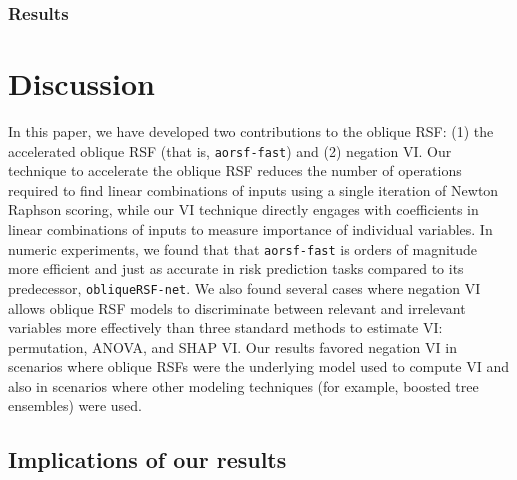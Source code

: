 \documentclass[twoside,11pt]{article}\usepackage[]{graphicx}\usepackage[]{xcolor}
\newcommand{\ie}{that is}
\newcommand{\eg}{for example}
\begin{document}
\subsubsection{Results}

\section{Discussion}

In this paper, we have developed two contributions to the oblique RSF: (1) the accelerated oblique RSF (\ie, \texttt{aorsf-fast}) and (2) negation VI. Our technique to accelerate the oblique RSF reduces the number of operations required to find linear combinations of inputs using a single iteration of Newton Raphson scoring, while our VI technique directly engages with coefficients in linear combinations of inputs to measure importance of individual variables. In numeric experiments, we found that that \texttt{aorsf-fast} is orders of magnitude more efficient and just as accurate in risk prediction tasks compared to its predecessor, \texttt{obliqueRSF-net}. We also found several cases where negation VI allows oblique RSF models to discriminate between relevant and irrelevant variables more effectively than three standard methods to estimate VI: permutation, ANOVA, and SHAP VI. Our results favored negation VI in scenarios where oblique RSFs were the underlying model used to compute VI and also in scenarios where other modeling techniques (\eg, boosted tree ensembles) were used.

\subsection{Implications of our results}
\end{document}

